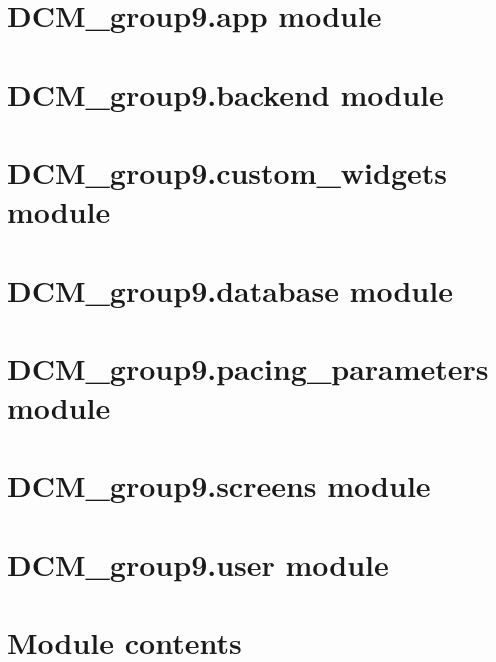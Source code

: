 \documentclass[letterpaper,10pt,english]{sphinxmanual}
\begin{document}
\chapter{DCM\_group9.app module}
\label{\detokenize{DCM_group9:dcm-group9-app-module}}

\chapter{DCM\_group9.backend module}
\label{\detokenize{DCM_group9:dcm-group9-backend-module}}

\chapter{DCM\_group9.custom\_widgets module}
\label{\detokenize{DCM_group9:dcm-group9-custom-widgets-module}}

\chapter{DCM\_group9.database module}
\label{\detokenize{DCM_group9:dcm-group9-database-module}}

\chapter{DCM\_group9.pacing\_parameters module}
\label{\detokenize{DCM_group9:dcm-group9-pacing-parameters-module}}

\chapter{DCM\_group9.screens module}
\label{\detokenize{DCM_group9:dcm-group9-screens-module}}

\chapter{DCM\_group9.user module}
\label{\detokenize{DCM_group9:dcm-group9-user-module}}

\chapter{Module contents}
\label{\detokenize{DCM_group9:module-contents}}


\renewcommand{\indexname}{Index}
\printindex
\end{document}
